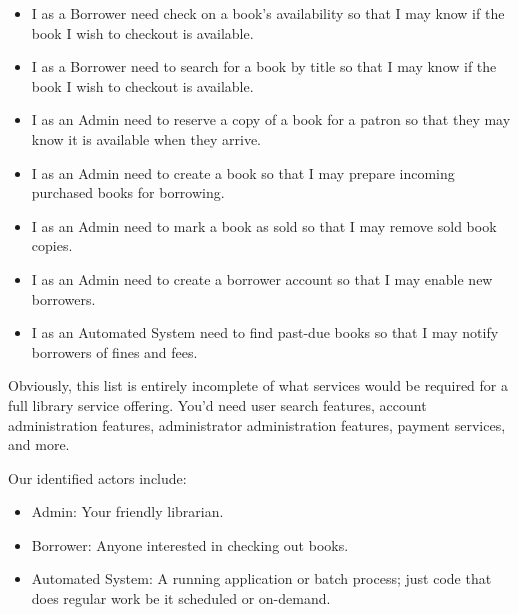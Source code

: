 \begin{itemize}
  \item I as a Borrower need check on a book's availability so that I may know if the book I wish to checkout is available.
  \item I as a Borrower need to search for a book by title so that I may know if the book I wish to checkout is available.
  \item I as an Admin need to reserve a copy of a book for a patron so that they may know it is available when they arrive.
  \item I as an Admin need to create a book so that I may prepare incoming purchased books for borrowing.
  \item I as an Admin need to mark a book as sold so that I may remove sold book copies.
  \item I as an Admin need to create a borrower account so that I may enable new borrowers.
  \item I as an Automated System need to find past-due books so that I may notify borrowers of fines and fees.
\end{itemize}

Obviously, this list is entirely incomplete of what services would be required for a full library service offering.  You'd need user search features, account administration features, administrator administration features, payment services, and more.

Our identified actors include:

\begin{itemize}
  \item Admin: Your friendly librarian.
  \item Borrower: Anyone interested in checking out books.
  \item Automated System: A running application or batch process; just code that does regular work be it scheduled or on-demand.
\end{itemize}
